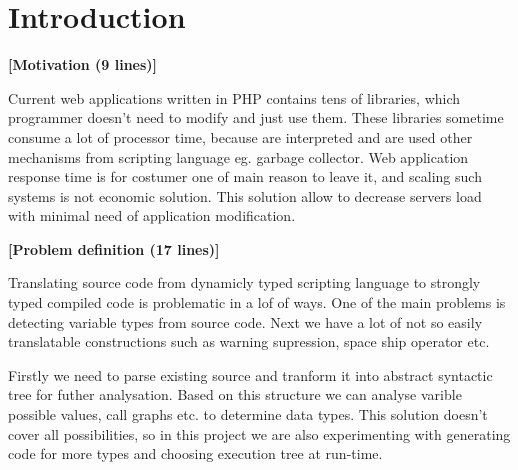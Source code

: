 \documentclass{ExcelAtFIT}
\affiliation{*%
  \href{mailto:xnechu01@stud.fit.vutbr.cz}{xnechu01@stud.fit.vutbr.cz},
  \textit{Faculty of Information Technology, Brno University of Technology}}
\begin{document}
\startdocument



\section{Introduction}

	\textbf{[Motivation (9 lines)]}

		Current web applications written in PHP contains tens of libraries, which programmer doesn't need to modify and just use them. These libraries sometime consume a lot of processor time, because are interpreted and are used other mechanisms from scripting language eg. garbage collector\cite{gcOptimize}. Web application response time is for costumer one of main reason to leave it, and scaling such systems is not economic solution. This solution allow to decrease servers load with minimal need of application modification.

	\textbf{[Problem definition (17 lines)]}

		Translating source code from dynamicly typed scripting language to strongly typed compiled code is problematic in a lof of ways. One of the main problems is detecting variable types from source code. Next we have a lot of not so easily translatable constructions such as warning supression, space ship operator etc.

		Firstly we need to parse existing source and tranform it into abstract syntactic tree for futher analysation. Based on this structure we can analyse varible possible values, call graphs etc. to determine data types. This solution doesn't cover all possibilities, so in this project we are also experimenting with generating code for more types and choosing execution tree at run-time.
\end{document}
